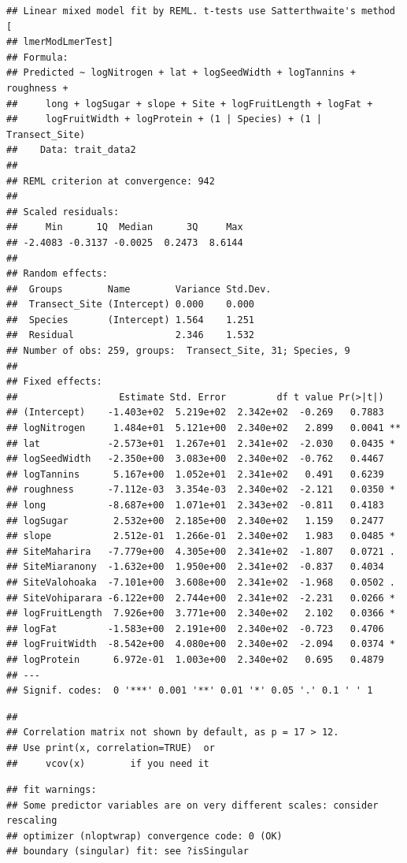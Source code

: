 \documentclass[
  12pt,
]{article}
\begin{document}
\begin{verbatim}
## Linear mixed model fit by REML. t-tests use Satterthwaite's method [
## lmerModLmerTest]
## Formula: 
## Predicted ~ logNitrogen + lat + logSeedWidth + logTannins + roughness +  
##     long + logSugar + slope + Site + logFruitLength + logFat +  
##     logFruitWidth + logProtein + (1 | Species) + (1 | Transect_Site)
##    Data: trait_data2
## 
## REML criterion at convergence: 942
## 
## Scaled residuals: 
##     Min      1Q  Median      3Q     Max 
## -2.4083 -0.3137 -0.0025  0.2473  8.6144 
## 
## Random effects:
##  Groups        Name        Variance Std.Dev.
##  Transect_Site (Intercept) 0.000    0.000   
##  Species       (Intercept) 1.564    1.251   
##  Residual                  2.346    1.532   
## Number of obs: 259, groups:  Transect_Site, 31; Species, 9
## 
## Fixed effects:
##                  Estimate Std. Error         df t value Pr(>|t|)   
## (Intercept)    -1.403e+02  5.219e+02  2.342e+02  -0.269   0.7883   
## logNitrogen     1.484e+01  5.121e+00  2.340e+02   2.899   0.0041 **
## lat            -2.573e+01  1.267e+01  2.341e+02  -2.030   0.0435 * 
## logSeedWidth   -2.350e+00  3.083e+00  2.340e+02  -0.762   0.4467   
## logTannins      5.167e+00  1.052e+01  2.341e+02   0.491   0.6239   
## roughness      -7.112e-03  3.354e-03  2.340e+02  -2.121   0.0350 * 
## long           -8.687e+00  1.071e+01  2.343e+02  -0.811   0.4183   
## logSugar        2.532e+00  2.185e+00  2.340e+02   1.159   0.2477   
## slope           2.512e-01  1.266e-01  2.340e+02   1.983   0.0485 * 
## SiteMaharira   -7.779e+00  4.305e+00  2.341e+02  -1.807   0.0721 . 
## SiteMiaranony  -1.632e+00  1.950e+00  2.341e+02  -0.837   0.4034   
## SiteValohoaka  -7.101e+00  3.608e+00  2.341e+02  -1.968   0.0502 . 
## SiteVohiparara -6.122e+00  2.744e+00  2.341e+02  -2.231   0.0266 * 
## logFruitLength  7.926e+00  3.771e+00  2.340e+02   2.102   0.0366 * 
## logFat         -1.583e+00  2.191e+00  2.340e+02  -0.723   0.4706   
## logFruitWidth  -8.542e+00  4.080e+00  2.340e+02  -2.094   0.0374 * 
## logProtein      6.972e-01  1.003e+00  2.340e+02   0.695   0.4879   
## ---
## Signif. codes:  0 '***' 0.001 '**' 0.01 '*' 0.05 '.' 0.1 ' ' 1
\end{verbatim}

\begin{verbatim}
## 
## Correlation matrix not shown by default, as p = 17 > 12.
## Use print(x, correlation=TRUE)  or
##     vcov(x)        if you need it
\end{verbatim}

\begin{verbatim}
## fit warnings:
## Some predictor variables are on very different scales: consider rescaling
## optimizer (nloptwrap) convergence code: 0 (OK)
## boundary (singular) fit: see ?isSingular
\end{verbatim}
\end{document}
